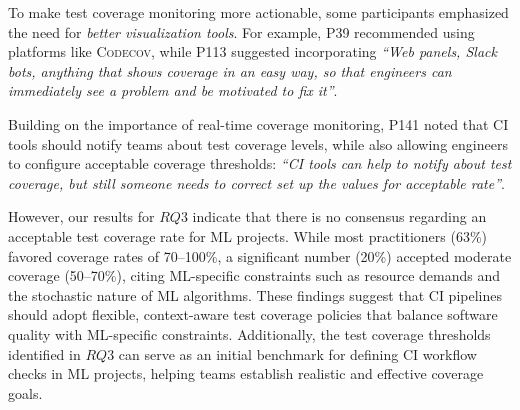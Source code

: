 To make test coverage monitoring more actionable, some participants emphasized the need for \textit{better visualization tools}. For example, P39 recommended using platforms like \textsc{Codecov}, while P113 suggested incorporating \textit{``Web panels, Slack bots, anything that shows coverage in an easy way, so that engineers can immediately see a problem and be motivated to fix it''}. 

Building on the importance of real-time coverage monitoring, P141 noted that CI tools should notify teams about test coverage levels, while also allowing engineers to configure acceptable coverage thresholds: \textit{``CI tools can help to notify about test coverage, but still someone needs to correct set up the values for acceptable rate''}. 

However, our results for $RQ3$ indicate that there is no consensus regarding an acceptable test coverage rate for ML projects. While most practitioners (63\%) favored coverage rates of 70–100\%, a significant number (20\%) accepted moderate coverage (50–70\%), citing ML-specific constraints such as resource demands and the stochastic nature of ML algorithms. 
These findings suggest that CI pipelines should adopt flexible, context-aware test coverage policies that balance software quality with ML-specific constraints. Additionally, the test coverage thresholds identified in $RQ3$ can serve as an initial benchmark for defining CI workflow checks in ML projects, helping teams establish realistic and effective coverage goals.




